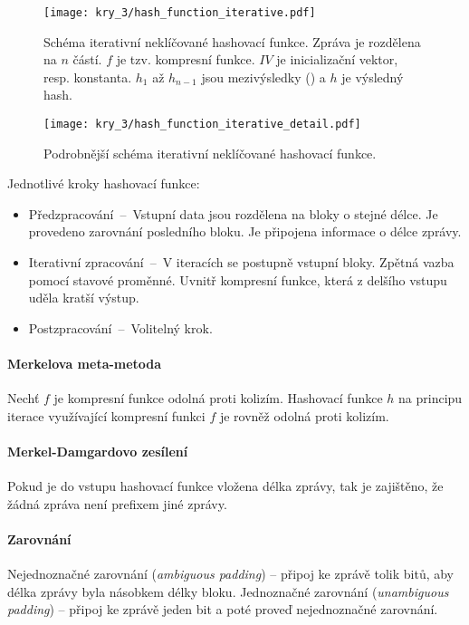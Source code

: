 \begin{figure}[H]
    \centering
    \texttt{[image: kry\_3/hash\_function\_iterative.pdf]}
    \caption{Schéma iterativní neklíčované hashovací funkce. Zpráva je rozdělena na $n$ částí. $f$ je tzv. kompresní funkce. $IV$ je inicializační vektor, resp. konstanta. $h_1$ až $h_{n-1}$ jsou mezivýsledky () a $h$ je výsledný hash.}
\end{figure}

\begin{figure}[H]
    \centering
    \texttt{[image: kry\_3/hash\_function\_iterative\_detail.pdf]}
    \caption{Podrobnější schéma iterativní neklíčované hashovací funkce.}
\end{figure}

Jednotlivé kroky hashovací funkce: \begin{itemize}
    \item Předzpracování~--~Vstupní data jsou rozdělena na bloky o stejné délce. Je provedeno zarovnání posledního bloku. Je připojena informace o délce zprávy.
    \item Iterativní zpracování~--~V iteracích se postupně  vstupní bloky. Zpět\-ná vazba pomocí stavové proměnné. Uvnitř kompresní funkce, která z delšího vstupu uděla kratší výstup.
    \item Postzpracování~--~Volitelný krok.
\end{itemize}

\paragraph*{Merkelova meta-metoda} Nechť $f$ je kompresní funkce odolná proti kolizím. Hashovací funkce $h$ na principu iterace využívající kompresní funkci $f$ je rovněž odolná proti kolizím.

\paragraph*{Merkel-Damgardovo zesílení} Pokud je do vstupu hashovací funkce vložena délka zprá\-vy, tak je zajištěno, že žádná zpráva není prefixem jiné zprávy.

\paragraph*{Zarovnání} Nejednoznačné zarovnání (\textit{ambiguous padding}) -- připoj ke zprávě tolik bitů, aby délka zprávy byla násobkem délky bloku. Jednoznačné zarovnání (\textit{unambiguous padding}) -- připoj ke zprávě jeden bit a poté proveď nejednoznačné zarovnání.

